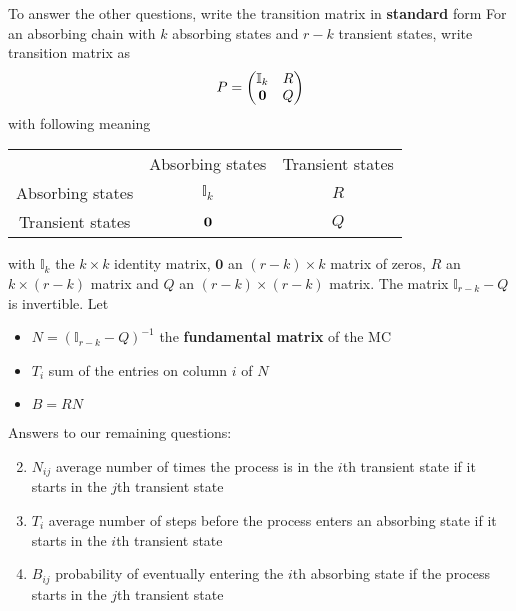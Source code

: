 \documentclass[aspectratio=169]{beamer}\usepackage[]{graphicx}\usepackage[]{xcolor}
\begin{document}
\begin{frame}
To answer the other questions, write the transition matrix in \textbf{standard} form
\vfill
For an absorbing chain with $k$ absorbing states and $r-k$ transient states, write transition matrix as
\[
P=\begin{pmatrix}
\mathbb{I}_k & R \\
\b0 & Q
\end{pmatrix}
\]
with following meaning
\begin{center}\footnotesize
\begin{tabular}{ccc}
& Absorbing states & Transient states \\
Absorbing states & $\mathbb{I}_k$ & $R$ \\
Transient states & $\b0$ & $Q$
\end{tabular}
\end{center}
with $\mathbb{I}_k$ the $k\times k$ identity matrix, $\mathbf{0}$ an $(r-k)\times k$ matrix of zeros, $R$ an $k\times (r-k)$ matrix and $Q$ an $(r-k)\times(r-k)$ matrix.
The matrix $\mathbb{I}_{r-k}-Q$ is invertible. Let
\begin{itemize}
\item $N=(\mathbb{I}_{r-k}-Q)^{-1}$ the \textbf{fundamental matrix} of the MC
\item $T_i$ sum of the entries on column $i$ of $N$
\item $B=RN$
\end{itemize}
\end{frame}

\begin{frame}
Answers to our remaining questions:
\vfill
\begin{enumerate}
\setcounter{enumi}{1}
\item $N_{ij}$ average number of times the process is in the $i$th transient state if it starts in the $j$th transient state
\vfill
\item $T_i$ average number of steps before the process enters an absorbing state if it starts in the $i$th transient state
\vfill
\item $B_{ij}$ probability of eventually entering the $i$th absorbing state if the process starts in the $j$th transient state
\end{enumerate}
\vfill
\end{frame}
\end{document}
